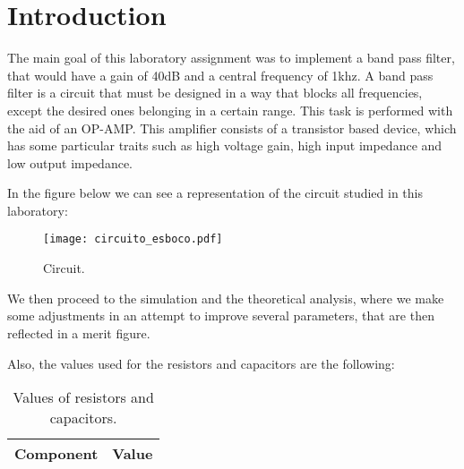 \section{Introduction}

The main goal of this laboratory assignment was to implement a band pass filter, that would have a gain of 40dB and a central frequency of 1khz. A band pass filter is a circuit that must be designed in a way that blocks all frequencies, except the desired ones belonging in a certain range. This task is performed with the aid of an OP-AMP. This amplifier consists of a transistor based device, which has some particular traits such as high voltage gain, high input impedance and low output impedance.

In the figure below we can see a representation of the circuit studied in this laboratory:

\begin{figure}[h] \centering
\texttt{[image: circuito\_esboco.pdf]}
\caption{Circuit.}
\label{fig:circ}
\end{figure}

We then proceed to the simulation and the theoretical analysis, where we make some adjustments in an attempt to improve several parameters, that are then reflected in a merit figure.

Also, the values used for the resistors and capacitors are the following:

\begin{table}[h]
  \centering
  \begin{tabular}{|l|r|}
    \hline    
    {\bf Component} & {\bf Value} \\ \hline
    
  \end{tabular}
  \caption{Values of resistors and capacitors.}
  \label{tab:valintro}
\end{table}
